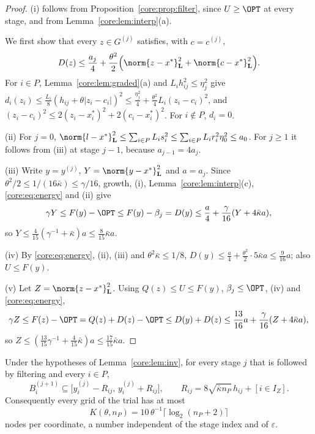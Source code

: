 \begin{proof}
(i) follows from Proposition~\ref{core:prop:filter}, since $U\ge\OPT$ at every
stage, and from Lemma~\ref{core:lem:interp}(a).

We first show that every $z\in G^{(j)}$ satisfies, with $c=c^{(j)}$,
\begin{equation}\label{core:eq:energy}
D(z)\le\frac{a_j}4+\frac{\theta^2}2\Bigl(\norm{z-x^*}_{\mathbf L}^2
+\norm{c-x^*}_{\mathbf L}^2\Bigr).
\end{equation}
For $i\in P$, Lemma~\ref{core:lem:graded}(a) and $L_ih_{ij}^2\le\eta_j^2$ give
$d_i(z_i)\le\frac{L_i}8(h_{ij}+\theta|z_i-c_i|)^2
\le\frac{\eta_j^2}4+\frac{\theta^2}4L_i(z_i-c_i)^2$, and
$(z_i-c_i)^2\le2(z_i-x_i^*)^2+2(c_i-x_i^*)^2$. For $i\notin P$, $d_i=0$.

(ii) For $j=0$, $\norm{l-x^*}_{\mathbf L}^2\le\sum_{i\in P}L_is_i^2\le
\sum_{i\in P}L_ir_i^2\eta_0^2\le a_0$. For $j\ge1$ it follows from (iii) at
stage $j-1$, because $a_{j-1}=4a_j$.

(iii) Write $y=y^{(j)}$, $Y=\norm{y-x^*}_{\mathbf L}^2$ and $a=a_j$. Since
$\theta^2/2\le1/(16\bar\kappa)\le\gamma/16$, growth, (i),
Lemma~\ref{core:lem:interp}(c), \eqref{core:eq:energy} and (ii) give
\[
\gamma Y\le F(y)-\OPT\le F(y)-\beta_j=D(y)\le\frac a4+\frac\gamma{16}(Y+4\bar\kappa a),
\]
so $Y\le\frac4{15}(\gamma^{-1}+\bar\kappa)a\le\frac8{15}\bar\kappa a$.

(iv) By \eqref{core:eq:energy}, (ii), (iii) and $\theta^2\bar\kappa\le1/8$,
$D(y)\le\frac a4+\frac{\theta^2}2\cdot5\bar\kappa a\le\frac9{16}a$; also
$U\le F(y)$.

(v) Let $Z=\norm{z-x^*}_{\mathbf L}^2$. Using $Q(z)\le U\le F(y)$,
$\beta_j\le\OPT$, (iv) and \eqref{core:eq:energy},
\[
\gamma Z\le F(z)-\OPT=Q(z)+D(z)-\OPT\le D(y)+D(z)
\le\frac{13}{16}a+\frac\gamma{16}(Z+4\bar\kappa a),
\]
so $Z\le(\frac{13}{15}\gamma^{-1}+\frac4{15}\bar\kappa)a\le\frac{17}{15}\bar\kappa a$.
\end{proof}

\begin{lemma}\label{core:lem:states}
Under the hypotheses of Lemma~\ref{core:lem:inv}, for every stage $j$ that is
followed by filtering and every $i\in P$,
\[
B_i^{(j+1)}\subseteq\bigl[y_i^{(j)}-R_{ij},\,y_i^{(j)}+R_{ij}\bigr],\qquad
R_{ij}=8\sqrt{\bar\kappa n_P}\,h_{ij}+[i\in I_Z].
\]
Consequently every grid of the trial has at most
\begin{equation}\label{core:eq:cap}
K(\theta,n_P)=10\,\theta^{-1}\lceil\log_2(n_P+2)\rceil
\end{equation}
nodes per coordinate, a number independent of the stage index and of
$\varepsilon$.
\end{lemma}

